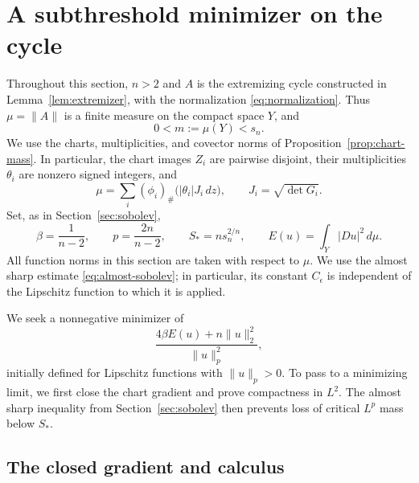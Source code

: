 \section{A subthreshold minimizer on the cycle}
\label{sec:minimizer}

Throughout this section, $n>2$ and $A$ is the extremizing cycle constructed
in Lemma~\ref{lem:extremizer}, with the normalization
\eqref{eq:normalization}.  Thus $\mu=\|A\|$ is a finite measure on the
compact space $Y$, and
\[
 0<m:=\mu(Y)<s_n.
\]
We use the charts, multiplicities, and covector norms of
Proposition~\ref{prop:chart-mass}.  In particular, the chart images $Z_i$
are pairwise disjoint, their multiplicities
$\theta_i$ are nonzero signed integers, and
\[
 \mu=\sum_i(\phi_i)_\#\bigl(|\theta_i|J_i\,dz\bigr),
 \qquad J_i=\sqrt{\det G_i}.
\]
Set, as in Section~\ref{sec:sobolev},
\[
 \beta=\frac1{n-2},\qquad p=\frac{2n}{n-2},\qquad
 S_*=ns_n^{2/n},\qquad E(u)=\int_Y|Du|^2\,d\mu.
\]
All function norms in this section are taken with respect to $\mu$.
We use the almost sharp estimate \eqref{eq:almost-sobolev}; in particular,
its constant $C_\epsilon$ is independent of the Lipschitz function to
which it is applied.

We seek a nonnegative minimizer of
\[
 \frac{4\beta E(u)+n\|u\|_2^2}{\|u\|_p^2},
\]
initially defined for Lipschitz functions with $\|u\|_p>0$.
To pass to a minimizing limit, we first close the chart gradient and
prove compactness in $L^2$. The almost sharp inequality from
Section~\ref{sec:sobolev} then prevents loss of critical $L^p$ mass
below $S_*$.

\subsection{The closed gradient and calculus}

